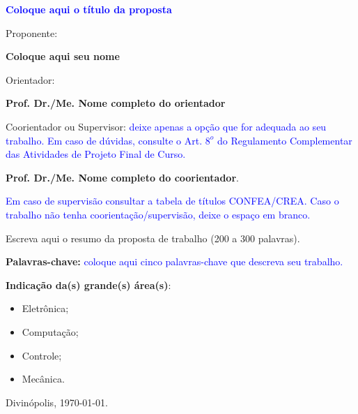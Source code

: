 \documentclass[oneside,a4paper,11pt]{article}
\newcommand{\orientacao}[1]{{\textcolor{blue}{#1}}}
\begin{document}
\thispagestyle{empty}
\begin{center}
\textbf{\orientacao{Coloque aqui o título da proposta }}
\vspace{.5cm}

\end{center}   

\noindent Proponente:

\noindent\textbf{Coloque aqui seu nome}

\vspace{0.5cm}

\noindent Orientador:

\noindent\textbf{Prof. Dr./Me. Nome completo do orientador}

\vspace{0.5cm}

\noindent Coorientador ou Supervisor: \orientacao{deixe apenas a opção que for adequada ao seu trabalho. Em caso de dúvidas, consulte o Art. $8^o$ do Regulamento Complementar das Atividades de Projeto Final de Curso.} \normalsize

\noindent\textbf{Prof. Dr./Me. Nome completo do coorientador}. 

\orientacao{Em caso de supervisão consultar a tabela de títulos CONFEA/CREA. Caso o trabalho não tenha coorientação/supervisão, deixe o espaço em branco.}

\vspace{0.5cm}

\noindent Escreva aqui o resumo da proposta de trabalho (200 a 300 palavras). 

\vspace{.5cm}

\noindent\textbf{Palavras-chave:} \orientacao{coloque aqui cinco palavras-chave que descreva seu trabalho.}

\begin{table}[!h]
\begin{minipage}{1\textwidth}
\textbf{Indicação da(s) grande(s) área(s)}:
  \begin{itemize}
  \item[{\LARGE $\Box$}] Eletrônica;
  \item[{\LARGE $\Box$}] Computação;
  \item[{\LARGE $\XBox$}] Controle;
  \item[{\LARGE $\Box$}] Mecânica.
  \end{itemize}

\vspace{2cm}

\begin{center}
Divinópolis, \today .
\end{center}
\end{minipage}
\end{table}
\end{document}
